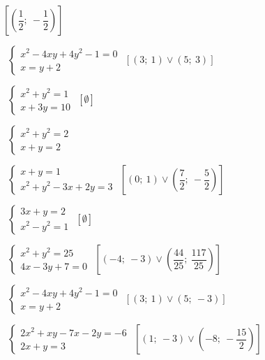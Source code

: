 \begin{esercizio}[\Ast]
\begin{multicols}{2}
\begin{enumeratea}
\hfill$\left[\left(\dfrac 1 2;~-\dfrac 1 2\right)\right]$
 \item~$\left\{\begin{array}{l}x^2-4xy+4y^2-1=0\\x=y+2\end{array}\right.$
\hfill$\left[\left(3;~1\right)\vee \left(5;~3\right)\right]$
 \item~$\left\{\begin{array}{l}x^2+y^2=1\\x+3y=10\end{array}\right.$
\hfill$\left[\emptyset\right]$
 \item~$\left\{\begin{array}{l}x^2+y^2=2\\x+y=2\end{array}\right.$
 \item~$\left\{\begin{array}{l}x+y=1\\x^2+y^2-3x+2y=3\end{array}\right.$
\hfill$\left[\left(0;~1\right)\vee \left(\dfrac 7 2;~-\dfrac 5 
2\right)\right]$
 \item~$\left\{\begin{array}{l}3x+y=2\\x^2-y^2=1\end{array}\right.$
\hfill$\left[\emptyset\right]$
 \item~$\left\{\begin{array}{l}x^2+y^2=25\\4x-3y+7=0\end{array}\right.$
\hfill$\left[\left(-4;~-3\right) \vee 
       \left(\dfrac{44}{25};~\dfrac{117}{25}\right)\right]$
 \item~$\left\{\begin{array}{l}x^2-4xy+4y^2-1=0\\x=y+2\end{array}\right.$
\hfill$\left[\left(3;~1\right)\vee \left(5;~-3\right)\right]$
 \item~$\left\{\begin{array}{l}2x^2+xy-7x-2y=-6\\2x+y=3\end{array}\right.$
\hfill$\left[\left(1;~-3\right)\vee \left(-8;~-\dfrac{15} 2\right)\right]$
 \end{enumeratea}
 \end{multicols}
\end{esercizio}

